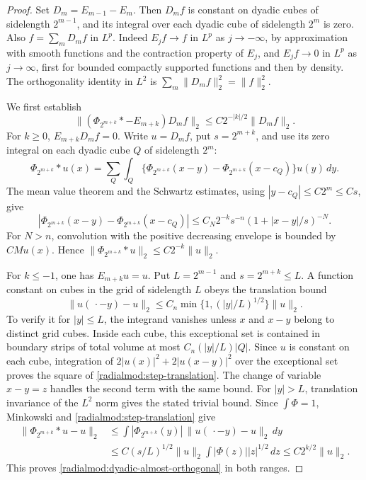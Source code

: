 \documentclass[11pt]{article}
\numberwithin{equation}{section}
\theoremstyle{remark}
\theoremstyle{definition}
\begin{document}
\begin{proof}
Set $D_m=E_{m-1}-E_m$. Then $D_mf$ is constant on dyadic cubes of
sidelength $2^{m-1}$, and its integral over each dyadic cube of
sidelength $2^m$ is zero. Also $f=\sum_mD_mf$ in $L^p$. Indeed
$E_jf\to f$ in $L^p$ as $j\to-\infty$, by approximation with smooth
functions and the contraction property of $E_j$, and $E_jf\to0$ in
$L^p$ as $j\to\infty$, first for bounded compactly supported functions
and then by density. The orthogonality identity in $L^2$ is
$\sum_m\|D_mf\|_2^2=\|f\|_2^2$.

We first establish
\begin{equation}\label{radialmod:dyadic-almost-orthogonal}
 \|(\Phi_{2^{m+k}}*-E_{m+k})D_mf\|_2
 \le C2^{-|k|/2}\|D_mf\|_2.
\end{equation}
For $k\ge0$, $E_{m+k}D_mf=0$. Write $u=D_mf$, put $s=2^{m+k}$,
and use its zero integral on each dyadic cube $Q$ of sidelength $2^m$:
\[
 \Phi_{2^{m+k}}*u(x)
 =\sum_Q\int_Q\{\Phi_{2^{m+k}}(x-y)-\Phi_{2^{m+k}}(x-c_Q)\}u(y)\,dy.
\]
The mean value theorem and the Schwartz estimates, using
$|y-c_Q|\le C2^m\le Cs$, give
\[
 |\Phi_{2^{m+k}}(x-y)-\Phi_{2^{m+k}}(x-c_Q)|
 \le C_N 2^{-k}s^{-n}(1+|x-y|/s)^{-N}.
\]
For $N>n$, convolution with the positive decreasing envelope is
bounded by $C Mu(x)$. Hence
$\|\Phi_{2^{m+k}}*u\|_2\le C2^{-k}\|u\|_2$.

For $k\le-1$, one has $E_{m+k}u=u$. Put $L=2^{m-1}$ and
$s=2^{m+k}\le L$. A function constant on cubes in the grid of
sidelength $L$ obeys the translation bound
\begin{equation}\label{radialmod:step-translation}
 \|u(\,\cdot-y)-u\|_2
 \le C_n\min\{1,(|y|/L)^{1/2}\}\|u\|_2.
\end{equation}
To verify it for $|y|\le L$, the integrand vanishes unless $x$ and
$x-y$ belong to distinct grid cubes. Inside each cube, this exceptional
set is contained in boundary strips of total volume at most
$C_n(|y|/L)|Q|$. Since $u$ is constant on each cube, integration of
$2|u(x)|^2+2|u(x-y)|^2$ over the exceptional set proves the square of
\eqref{radialmod:step-translation}. The change of variable $x-y=z$
handles the second term with the same bound. For $|y|>L$, translation
invariance of the $L^2$ norm gives the stated trivial bound.
Since $\int\Phi=1$, Minkowski and
\eqref{radialmod:step-translation} give
\begin{align*}
 \|\Phi_{2^{m+k}}*u-u\|_2
 &\le\int |\Phi_{2^{m+k}}(y)|\,\|u(\,\cdot-y)-u\|_2\,dy\\
 &\le C(s/L)^{1/2}\|u\|_2\int|\Phi(z)||z|^{1/2}\,dz
 \le C2^{k/2}\|u\|_2.
\end{align*}
This proves \eqref{radialmod:dyadic-almost-orthogonal} in both ranges.


\end{proof}
\end{document}
